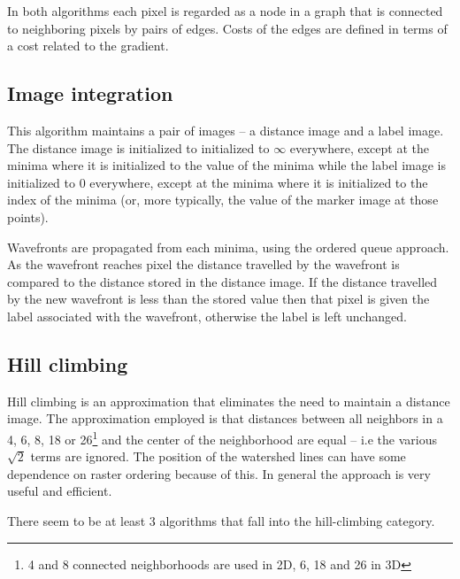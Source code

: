 \documentclass{InsightArticle}
\begin{document}
In both algorithms each pixel is regarded as a node in a graph that is
connected to neighboring pixels by pairs of edges. Costs of the edges
are defined in terms of a cost related to the gradient.

\subsection{Image integration}
This algorithm maintains a pair of images -- a distance image and a
label image. The distance image is initialized to initialized to
$\infty$ everywhere, except at the minima where it is initialized to
the value of the minima while the label image is initialized to $0$
everywhere, except at the minima where it is initialized to the index
of the minima (or, more typically, the value of the marker image at
those points).

Wavefronts are propagated from each minima, using the ordered queue
approach. As the wavefront reaches pixel the distance travelled by the
wavefront is compared to the distance stored in the distance image. If
the distance travelled by the new wavefront is less than the stored
value then that pixel is given the label associated with the
wavefront, otherwise the label is left unchanged.

\subsection{Hill climbing}
\label{sect:hillclimbing}
Hill climbing is an approximation that eliminates the need to maintain
a distance image. The approximation employed is that distances between
all neighbors in a 4, 6, 8, 18 or 26\footnote{4 and 8 connected
neighborhoods are used in 2D, 6, 18 and 26 in 3D} and the center of
the neighborhood are equal -- i.e the various $\sqrt{2}$ terms are
ignored. The position of the watershed lines can have some dependence
on raster ordering because of this. In general the approach is very
useful and efficient.

There seem to be at least 3 algorithms that fall into the
hill-climbing category.

\end{document}
